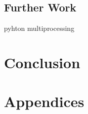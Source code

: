 \documentclass[12pt, a4paper]{report}
\begin{document}
\section{Further Work}
pyhton multiprocessing

\chapter{Conclusion}

\printglossary[type=\acronymtype]
\printbibliography[heading=bibintoc]

\clearpage

\appendix
\chapter*{Appendices}
\setcounter{table}{0}
\renewcommand{\thetable}{A\arabic{table}}
\renewcommand{\thesubsection}{\Alph{subsection}}
\end{document}
